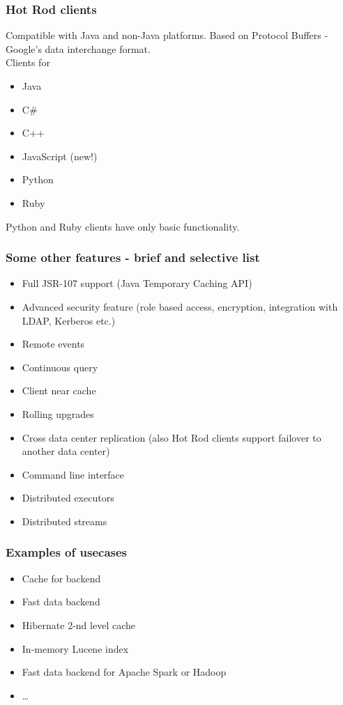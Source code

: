 \documentclass[10pt,utf8]{beamer}
\begin{document}
\begin{frame}
  \frametitle{Hot Rod clients}
	Compatible with Java and non-Java platforms. Based on Protocol Buffers - Google's data interchange format.\\
	\vspace{0.5cm}
	Clients for
	\begin{itemize}
		\item Java
		\item C\#
		\item C++
		\item JavaScript (\color{red}new!\color{black})
		\item Python
		\item Ruby
	\end{itemize}
	Python and Ruby clients have only basic functionality.
\end{frame}

\begin{frame}
  \frametitle{Some other features - brief and selective list}
  \begin{itemize}
		\item Full JSR-107 support (Java Temporary Caching API)
		\pause
		\item Advanced security feature (role based access, encryption, integration with LDAP, Kerberos etc.)
		\pause
		\item Remote events
		\pause
		\item Continuous query
		\pause
		\item Client near cache
		\pause
		\item Rolling upgrades
		\pause
		\item Cross data center replication (also Hot Rod clients support failover to another data center)
		\pause
		\item Command line interface
		\pause
		\item Distributed executors
		\pause
		\item Distributed streams
  \end{itemize}
\end{frame}

\begin{frame}
	\frametitle{Examples of usecases}
	\begin{itemize}
		\item Cache for backend 
		\item Fast data backend
		\item Hibernate 2-nd level cache
		\item In-memory Lucene index
		\item Fast data backend for Apache Spark or Hadoop
		\item \dots
	\end{itemize}
\end{frame}
\end{document}
